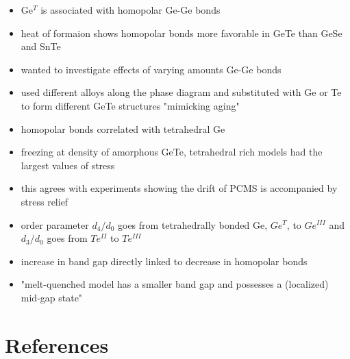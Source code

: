 \documentclass[3p,review,12pt]{elsarticle}
\begin{document}
\begin{itemize}
 	\begin{itemize}
 		\item Ge$^{T}$ is associated with homopolar Ge-Ge bonds
 		\item heat of formaion shows homopolar bonds more favorable in GeTe than GeSe and SnTe
 		\item wanted to investigate effects of varying amounts Ge-Ge bonds
 		\item used different alloys along the phase diagram and substituted with Ge or Te to form different GeTe structures "mimicking aging"
 		\item homopolar bonds correlated with tetrahedral Ge
 		\item freezing at density of amorphous GeTe, tetrahedral rich models had the largest values of stress
 		\item this agrees with experiments showing the drift of PCMS is accompanied by stress relief
 		\item order parameter $d_{4}/d_{0}$ goes from tetrahedrally bonded Ge, $Ge^{T}$, to $Ge^{III}$ and $d_{3}/d_{0}$ goes from $Te^{II}$ to $Te^{III}$
 		\item increase in band gap directly linked to decrease in homopolar bonds
 		\item "melt-quenched model has a smaller band gap and possesses a (localized) mid-gap state"
 	\end{itemize}	
\end{itemize}

\section*{References}



\end{document}
